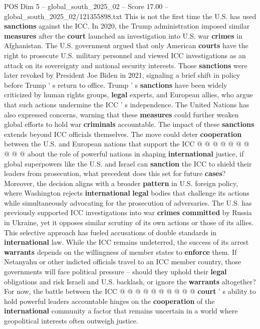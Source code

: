 \begin{textsample}{POS Dim 5 – global\_south\_2025\_02 – Score 17.00 – global\_south\_2025\_02/121355898.txt}
This is not the first time the U.S. has used \textbf{sanctions} against the ICC.
In 2020, the Trump administration imposed similar \textbf{measures} after the \textbf{court} launched an investigation into U.S. war \textbf{crimes} in Afghanistan.
The U.S. government argued that only American \textbf{courts} have the right to prosecute U.S. military personnel and viewed ICC investigations as an attack on its sovereignty and national security interests.
Those \textbf{sanctions} were later revoked by President Joe Biden in 2021, signaling a brief shift in policy before Trump ' s return to office.
Trump ' s \textbf{sanctions} have been widely criticized by human rights groups, \textbf{legal} experts, and European allies, who argue that such actions undermine the ICC ' s independence.
The United Nations has also expressed concerns, warning that these \textbf{measures} could further weaken global efforts to hold war \textbf{criminals} accountable.
The impact of these \textbf{sanctions} extends beyond ICC officials themselves.
The move could deter \textbf{cooperation} between the U.S. and European nations that support the ICC @ @ @ @ @ @ @ @ @ @ about the role of powerful nations in shaping \textbf{international} justice, if global superpowers like the U.S. and Israel can \textbf{sanction} the ICC to shield their leaders from prosecution, what precedent does this set for future \textbf{cases}?
Moreover, the decision aligns with a broader \textbf{pattern} in U.S. foreign policy, where Washington rejects \textbf{international} \textbf{legal} bodies that challenge its actions while simultaneously advocating for the prosecution of adversaries.
The U.S. has previously supported ICC investigations into war \textbf{crimes} \textbf{committed} by Russia in Ukraine, yet it opposes similar scrutiny of its own actions or those of its allies.
This selective approach has fueled accusations of double standards in \textbf{international} law.
While the ICC remains undeterred, the success of its arrest \textbf{warrants} depends on the willingness of member states to \textbf{enforce} them.
If Netanyahu or other indicted officials travel to an ICC member country, those governments will face political pressure -- should they uphold their \textbf{legal} obligations and risk Israeli and U.S. backlash, or ignore the \textbf{warrants} altogether?
For now, the battle between the ICC @ @ @ @ @ @ @ @ @ @ \textbf{court} ' s ability to hold powerful leaders accountable hinges on the \textbf{cooperation} of the \textbf{international} community a factor that remains uncertain in a world where geopolitical interests often outweigh justice.

\end{textsample}
